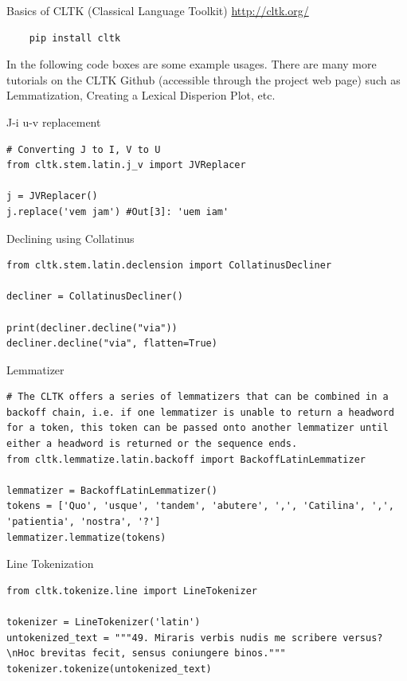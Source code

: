 \documentclass[10pt]{beamer}
\begin{document}
\begin{frame}{Basics of CLTK (Classical Language Toolkit)}
\protect\url{http://cltk.org/}

\begin{verbatim}
    pip install cltk
\end{verbatim}

In the following code boxes are some example usages.
There are many more tutorials on the CLTK Github (accessible through the project web page) such as Lemmatization, Creating a Lexical Disperion Plot, etc.
\end{frame}

\begin{frame}{J-i u-v replacement} 
\begin{verbatim}
# Converting J to I, V to U
from cltk.stem.latin.j_v import JVReplacer

j = JVReplacer()
j.replace('vem jam') #Out[3]: 'uem iam'
\end{verbatim}
\end{frame}

\begin{frame}{Declining using Collatinus} 
\begin{verbatim}
from cltk.stem.latin.declension import CollatinusDecliner

decliner = CollatinusDecliner()

print(decliner.decline("via"))
decliner.decline("via", flatten=True)
\end{verbatim}
\end{frame}

\begin{frame}{Lemmatizer} 
\begin{verbatim}
# The CLTK offers a series of lemmatizers that can be combined in a backoff chain, i.e. if one lemmatizer is unable to return a headword for a token, this token can be passed onto another lemmatizer until either a headword is returned or the sequence ends.
from cltk.lemmatize.latin.backoff import BackoffLatinLemmatizer

lemmatizer = BackoffLatinLemmatizer()
tokens = ['Quo', 'usque', 'tandem', 'abutere', ',', 'Catilina', ',', 'patientia', 'nostra', '?']
lemmatizer.lemmatize(tokens)
\end{verbatim}
\end{frame}

\begin{frame}{Line Tokenization} 
\begin{verbatim}
from cltk.tokenize.line import LineTokenizer

tokenizer = LineTokenizer('latin')
untokenized_text = """49. Miraris verbis nudis me scribere versus?\nHoc brevitas fecit, sensus coniungere binos."""
tokenizer.tokenize(untokenized_text)
\end{verbatim}
\end{frame}
\end{document}
